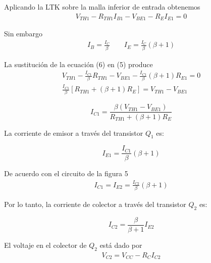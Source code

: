 \documentclass[12pt]{article}
\begin{document}
\noindent Aplicando la LTK sobre la malla inferior de entrada obtenemos
\begin{align}
	V_{TH1} - R_{TH1}I_{B1} - V_{BE1} - R_{E}I_{E1} = 0
\end{align}

\noindent Sin embargo
\begin{align}
	I_B = \frac{I_C}{\beta} \quad \quad I_E = \frac{I_C}{\beta}(\beta + 1)
\end{align}

\noindent La sustitución de la ecuación (6) en (5) produce
\begin{align}
	V_{TH1} - \frac{I_{C1}}{\beta}R_{TH1} - V_{BE1} - \frac{I_{C1}}{\beta}(\beta + 1)R_{E1} = 0\\
	\frac{I_{C1}}{\beta} \left[ R_{TH1} + (\beta + 1)R_E \right] = V_{TH1} - V_{BE1} 
\end{align}

\begin{tcolorbox}[colback=red!5!white,colframe=red!75!black,arc=0mm,boxrule=0mm,width=(\linewidth+0.5cm)]
	\begin{equation}
		I_{C1} = \frac{\beta(V_{TH1} - V_{BE1})}{R_{TH1} + (\beta + 1)R_E}
	\end{equation}
\end{tcolorbox}

\noindent La corriente de emisor a través del transistor $Q_1$ es:
\begin{tcolorbox}[colback=red!5!white,colframe=red!75!black,arc=0mm,boxrule=0mm,width=(\linewidth+0.5cm)]
	\begin{equation}
		I_{E1} = \frac{I_{C1}}{\beta}(\beta +1)
	\end{equation}
\end{tcolorbox}

De acuerdo con el circuito de la figura 5
\begin{align}
	I_{C1} = I_{E2} = \frac{I_{C2}}{\beta}(\beta + 1)
\end{align}

\noindent Por lo tanto, la corriente de colector a través del transistor $Q_2$ es:
\begin{tcolorbox}[colback=red!5!white,colframe=red!75!black,arc=0mm,boxrule=0mm,width=(\linewidth+0.5cm)]
	\begin{equation}
		I_{C2} = \frac{\beta}{\beta + 1}I_{E2}
	\end{equation}
\end{tcolorbox}

\noindent El voltaje en el colector de $Q_2$ está dado por
\begin{align}
	V_{C2} = V_{CC} - R_CI_{C2}
\end{align}
\end{document}
